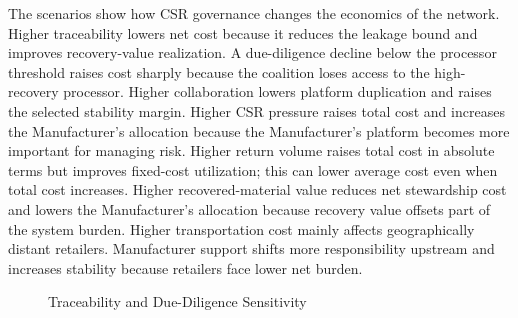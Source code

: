 The scenarios show how CSR governance changes the economics of the network. Higher traceability lowers net cost because it reduces the leakage bound and improves recovery-value realization. A due-diligence decline below the processor threshold raises cost sharply because the coalition loses access to the high-recovery processor. Higher collaboration lowers platform duplication and raises the selected stability margin. Higher CSR pressure raises total cost and increases the Manufacturer's allocation because the Manufacturer's platform becomes more important for managing risk. Higher return volume raises total cost in absolute terms but improves fixed-cost utilization; this can lower average cost even when total cost increases. Higher recovered-material value reduces net stewardship cost and lowers the Manufacturer's allocation because recovery value offsets part of the system burden. Higher transportation cost mainly affects geographically distant retailers. Manufacturer support shifts more responsibility upstream and increases stability because retailers face lower net burden.

\begin{figure}[htbp]
\centering
{}
\hfill
{}
\caption{Traceability and Due-Diligence Sensitivity}
\label{fig:ch4_traceability_due_diligence}
\end{figure}

